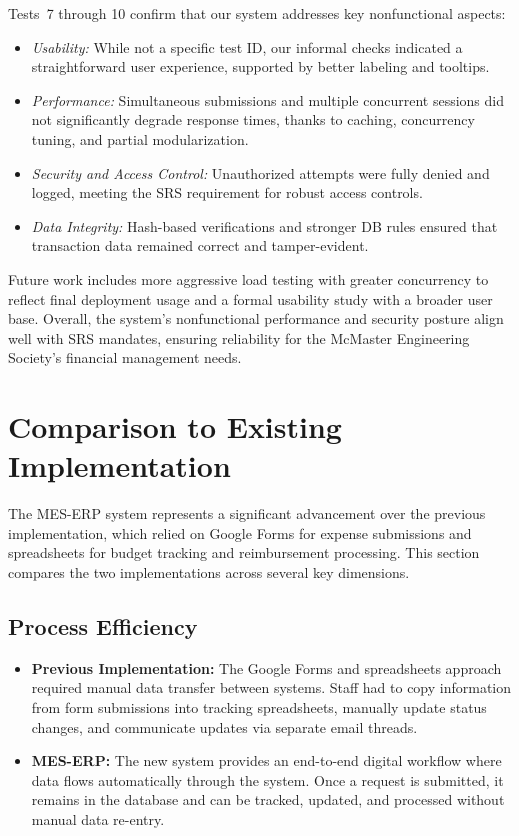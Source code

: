 \documentclass[12pt, titlepage]{article}
\begin{document}
Tests~7 through 10 confirm that our system addresses key nonfunctional aspects: 
\begin{itemize}
  \item \emph{Usability:} While not a specific test ID, our informal checks indicated a straightforward user experience, supported by better labeling and tooltips.
  \item \emph{Performance:} Simultaneous submissions and multiple concurrent sessions did not significantly degrade response times, thanks to caching, concurrency tuning, and partial modularization.
  \item \emph{Security and Access Control:} Unauthorized attempts were fully denied and logged, meeting the SRS requirement for robust access controls.
  \item \emph{Data Integrity:} Hash-based verifications and stronger DB rules ensured that transaction data remained correct and tamper-evident.
\end{itemize}

Future work includes more aggressive load testing with greater concurrency to reflect final deployment usage and a formal usability study with a broader user base. Overall, the system’s nonfunctional performance and security posture align well with SRS mandates, ensuring reliability for the McMaster Engineering Society’s financial management needs.


\section{Comparison to Existing Implementation}	

The MES-ERP system represents a significant advancement over the previous implementation, which relied on Google Forms for expense submissions and spreadsheets for budget tracking and reimbursement processing. This section compares the two implementations across several key dimensions.

\subsection{Process Efficiency}

\begin{itemize}
    \item \textbf{Previous Implementation:} The Google Forms and spreadsheets approach required manual data transfer between systems. Staff had to copy information from form submissions into tracking spreadsheets, manually update status changes, and communicate updates via separate email threads.
    
    \item \textbf{MES-ERP:} The new system provides an end-to-end digital workflow where data flows automatically through the system. Once a request is submitted, it remains in the database and can be tracked, updated, and processed without manual data re-entry.
\end{itemize}
\end{document}
